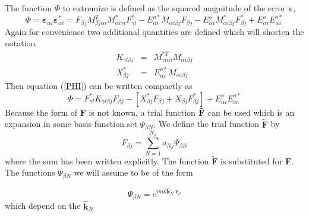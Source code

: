 \documentclass{article}
\begin{document}
The function $\Phi $ to extremize is defined as the squared magnitude of the
error $\mathbf{\varepsilon },$%
\begin{equation}
\Phi =\mathbf{\varepsilon }_{\alpha i}\mathbf{\varepsilon }_{\alpha i}^{\ast
}=F_{\beta j}M_{\beta j\alpha i}^{T}M_{\alpha i\gamma l}^{\ast }F_{\gamma
l}^{\ast }-E_{\alpha i}^{o\ast }M_{\alpha i\beta j}F_{\beta j}-E_{\alpha
i}^{o}M_{\alpha i\beta j}^{\ast }F_{\beta j}^{\ast }+E_{\alpha
i}^{o}E_{\alpha i}^{o\ast }  \label{PHI}
\end{equation}%
Again for convenience two additional quantities are defined which will
shorten the notation 
\begin{eqnarray}
K_{\gamma l\beta j} &=&M_{\gamma l\alpha i}^{\ast T}M_{\alpha i\beta j} \\
X_{\beta j}^{\ast } &=&E_{\alpha i}^{o\ast }M_{\alpha i\beta j}
\end{eqnarray}%
Then equation (\ref{PHI}) can be written compactly as 
\begin{equation}
\Phi =F_{\gamma l}^{\ast }K_{\gamma l\beta j}F_{\beta j}-\left[ X_{\beta
j}^{\ast }F_{\beta j}+X_{\beta j}F_{\beta j}^{\ast }\right] +E_{\alpha
i}^{o}E_{\alpha i}^{o\ast }
\end{equation}%
Because the form of $\mathbf{F}$ is not known, a trial function $\mathbf{%
\tilde{F}}$ can be used which is an expansion in some basis function set $%
\Psi _{\beta N}.$ We define the trial function $\mathbf{\tilde{F}}$ by 
\begin{equation}
\tilde{F}_{\beta j}\mathbf{=}\sum_{N=1}^{N_{k}}a_{Nj}\Psi _{\beta N}
\end{equation}%
where the sum has been written explicitly. The function $\mathbf{\tilde{F}}$
is substituted for $\mathbf{F.}$ The functions $\Psi _{\beta N}$ we will
assume to be of the form

\begin{equation}
\Psi _{\beta N}=e^{imk\mathbf{\hat{k}}_{N}\mathbf{\cdot r}_{\beta }}
\end{equation}%
which depend on the $\mathbf{\hat{k}}_{N}$
\end{document}
